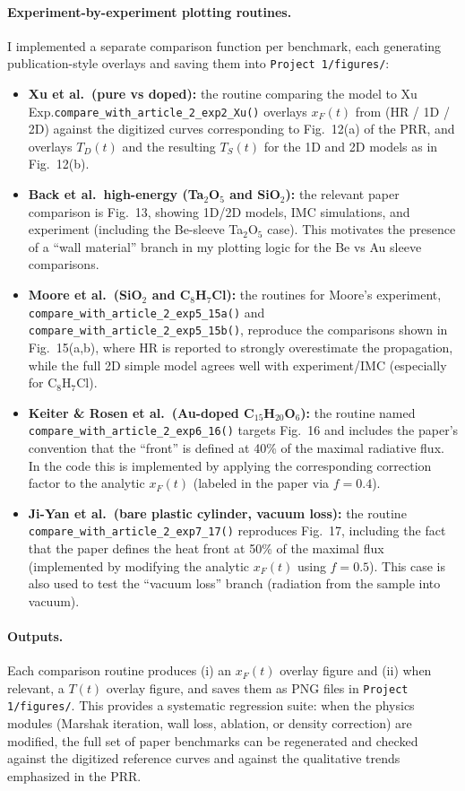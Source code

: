 \documentclass{article}
\begin{document}
\paragraph{Experiment-by-experiment plotting routines.}
I implemented a separate comparison function per benchmark, each generating publication-style overlays and saving them into \texttt{Project 1/figures/}:
\begin{itemize}
    \item \textbf{Xu et al.\ (pure vs doped):} the routine comparing the model to Xu Exp.\texttt{compare\_with\_article\_2\_exp2\_Xu()} overlays $x_F(t)$ from (HR / 1D / 2D) against the digitized curves corresponding to Fig.~12(a) of the PRR, and overlays $T_D(t)$ and the resulting $T_S(t)$ for the 1D and 2D models as in Fig.~12(b).
    \item \textbf{Back et al.\ high-energy (Ta$_2$O$_5$ and SiO$_2$):} the relevant paper comparison is Fig.~13, showing 1D/2D models, IMC simulations, and experiment (including the Be-sleeve Ta$_2$O$_5$ case). This motivates the presence of a ``wall material'' branch in my plotting logic for the Be vs Au sleeve comparisons.
    \item \textbf{Moore et al.\ (SiO$_2$ and C$_8$H$_7$Cl):} the routines for Moore's experiment, \texttt{compare\_with\_article\_2\_exp5\_15a()} and \texttt{compare\_with\_article\_2\_exp5\_15b()}, reproduce the comparisons shown in Fig.~15(a,b), where HR is reported to strongly overestimate the propagation, while the full 2D simple model agrees well with experiment/IMC (especially for C$_8$H$_7$Cl).
    \item \textbf{Keiter \& Rosen et al.\ (Au-doped C$_{15}$H$_{20}$O$_6$):} the routine named \texttt{compare\_with\_article\_2\_exp6\_16()} targets Fig.~16 and includes the paper's convention that the ``front'' is defined at 40\% of the maximal radiative flux. In the code this is implemented by applying the corresponding correction factor to the analytic $x_F(t)$ (labeled in the paper via $f=0.4$).
    \item \textbf{Ji-Yan et al.\ (bare plastic cylinder, vacuum loss):} the routine \texttt{compare\_with\_article\_2\_exp7\_17()} reproduces Fig.~17, including the fact that the paper defines the heat front at 50\% of the maximal flux (implemented by modifying the analytic $x_F(t)$ using $f=0.5$). This case is also used to test the ``vacuum loss'' branch (radiation from the sample into vacuum).
\end{itemize}

\paragraph{Outputs.}
Each comparison routine produces (i) an $x_F(t)$ overlay figure and (ii) when relevant, a $T(t)$ overlay figure, and saves them as PNG files in
\texttt{Project 1/figures/}. This provides a systematic regression suite: when the physics modules (Marshak iteration, wall loss, ablation, or density correction) are modified, the full set of paper benchmarks can be regenerated and checked against the digitized reference curves and against the qualitative trends emphasized in the PRR.
\end{document}
